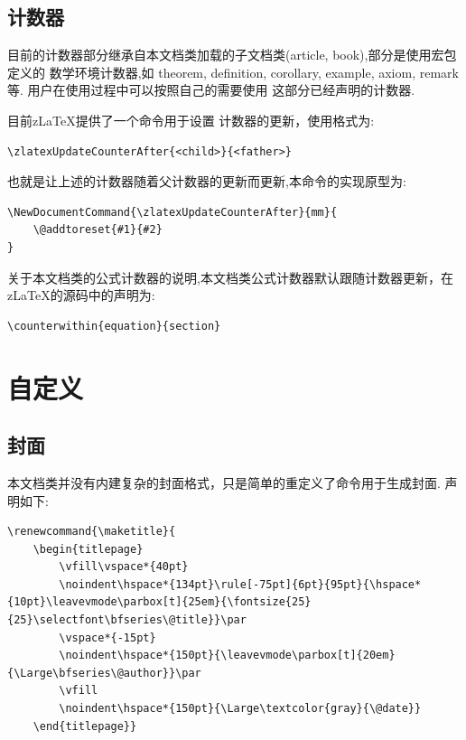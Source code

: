 \subsection{计数器}
目前的计数器部分继承自本文档类加载的子文档类(article, book),部分是使用宏包定义的
数学环境计数器,如 theorem, definition, corollary, example, axiom, remark等. 用户在使用过程中可以按照自己的需要使用
这部分已经声明的计数器.

目前z\LaTeX{}提供了一个命令\cmd{\zlatexUpdateCounterAfter}\index{\cmd{\zlatexUpdateCounterAfter}}用于设置
计数器的更新，使用格式为:
\begin{verbatim}
\zlatexUpdateCounterAfter{<child>}{<father>}
\end{verbatim}

也就是让上述的计数器随着父计数器的更新而更新,本命令的实现原型为:
\begin{verbatim}
\NewDocumentCommand{\zlatexUpdateCounterAfter}{mm}{
    \@addtoreset{#1}{#2}
}
\end{verbatim}

关于本文档类的公式计数器的说明,本文档类公式计数器默认跟随计数器更新，在z\LaTeX{}的源码中的声明为:
\begin{verbatim}
\counterwithin{equation}{section}
\end{verbatim}

\section{自定义}
\subsection{封面}
本文档类并没有内建复杂的封面格式，只是简单的重定义了\cmd{\maketitle}命令用于生成封面. 
声明如下:
\begin{verbatim}
\renewcommand{\maketitle}{
    \begin{titlepage}
        \vfill\vspace*{40pt}
        \noindent\hspace*{134pt}\rule[-75pt]{6pt}{95pt}{\hspace*{10pt}\leavevmode\parbox[t]{25em}{\fontsize{25}{25}\selectfont\bfseries\@title}}\par
        \vspace*{-15pt}
        \noindent\hspace*{150pt}{\leavevmode\parbox[t]{20em}{\Large\bfseries\@author}}\par
        \vfill
        \noindent\hspace*{150pt}{\Large\textcolor{gray}{\@date}}
    \end{titlepage}} 
\end{verbatim}

